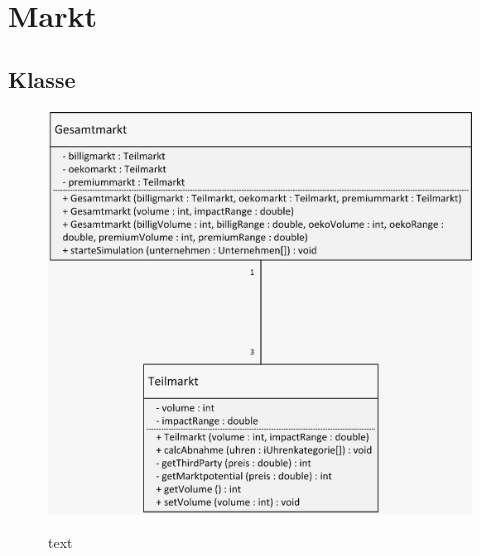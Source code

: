 \clearpage
\chapter{Markt}
\section{Klasse}
\begin{figure} [!h]
	\centering
	\includegraphics[scale=0.3]{img/Markt.png} 
	\label{key}
	\caption{text}
\end{figure}
\clearpage

